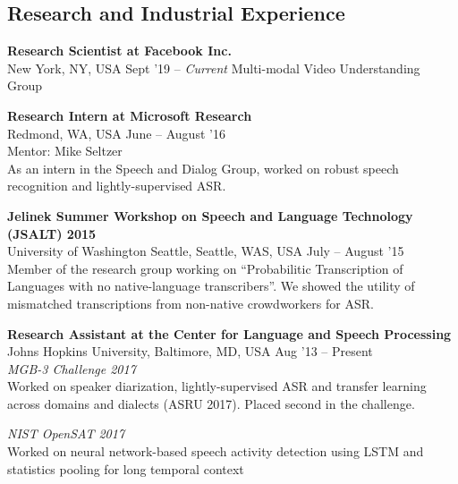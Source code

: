 \documentclass[margin,line,pifont,palatino,courier]{res}
\begin{document}
\begin{resume}
\section{\sc Research and Industrial Experience}

\textbf{Research Scientist at Facebook Inc.} \\
New York, NY, USA \hfill Sept '19 -- \textit{Current}
Multi-modal Video Understanding Group


\textbf{Research Intern at Microsoft Research} \\
Redmond, WA, USA \hfill
June -- August '16 \vspace{2pt} \\
Mentor: Mike Seltzer \\
As an intern in the Speech and Dialog Group, worked on robust speech recognition and lightly-supervised ASR.

\textbf{Jelinek Summer Workshop on Speech and Language Technology (JSALT) 2015 } \\
University of Washington Seattle, Seattle, WAS, USA \hfill
July -- August '15 \vspace{2pt} \\
Member of the research group working on ``Probabilitic Transcription of Languages with no native-language transcribers''. We showed the utility of mismatched transcriptions from non-native crowdworkers for ASR.
\vspace{-5pt}

\textbf{Research Assistant at the Center for Language and Speech Processing} \\
Johns Hopkins University, Baltimore, MD, USA \hfill Aug '13 -- Present \vspace{2pt} \\
\textit{MGB-3 Challenge 2017} \\
Worked on speaker diarization, lightly-supervised ASR and transfer learning across domains and dialects (ASRU 2017). Placed second in the challenge.

\textit{NIST OpenSAT 2017} \\
Worked on neural network-based speech activity detection using LSTM and statistics pooling for long temporal context


\end{resume}
\end{document}
